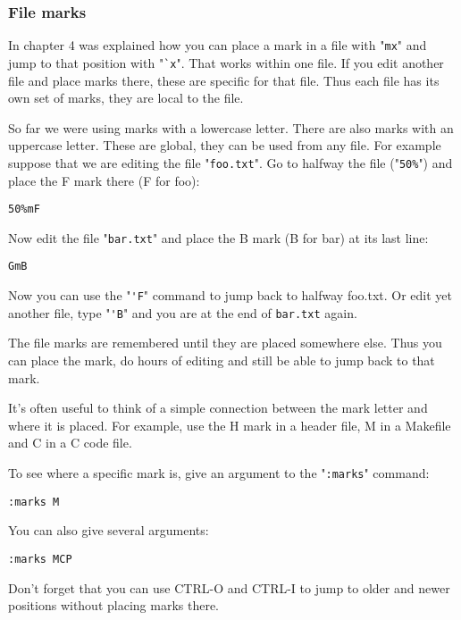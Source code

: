 \subsubsection{File marks}
In chapter 4 was explained how you can place a mark in a file with "\verb!mx!" and jump to that position with "\verb!`x!".
That works within one file.
If you edit another file and place marks there, these are specific for that file.
Thus each file has its own set of marks, they are local to the file.

So far we were using marks with a lowercase letter.  There are also marks
with an uppercase letter.  These are global, they can be used from any file.
For example suppose that we are editing the file "\verb!foo.txt!".  Go to halfway the
file ("\verb!50%!") and place the F mark there (F for foo):

 \begin{Verbatim}[samepage=true]
 50%mF
 \end{Verbatim}

Now edit the file "\verb!bar.txt!" and place the B mark (B for bar) at its last line:

 \begin{Verbatim}[samepage=true]
 GmB
 \end{Verbatim}

Now you can use the "\verb!'F!" command to jump back to halfway foo.txt.
Or edit yet another file, type "\verb!'B!" and you are at the end of \verb!bar.txt! again.

The file marks are remembered until they are placed somewhere else.
Thus you can place the mark, do hours of editing and still be able to jump back to that mark.

It's often useful to think of a simple connection between the mark letter and where it is placed.
For example, use the H mark in a header file, M in a Makefile and C in a C code file.

To see where a specific mark is, give an argument to the "\verb!:marks!" command:

 \begin{Verbatim}[samepage=true]
 :marks M
 \end{Verbatim}

You can also give several arguments:

 \begin{Verbatim}[samepage=true]
 :marks MCP
 \end{Verbatim}

Don't forget that you can use CTRL-O and CTRL-I to jump to older and newer positions without placing marks there.

